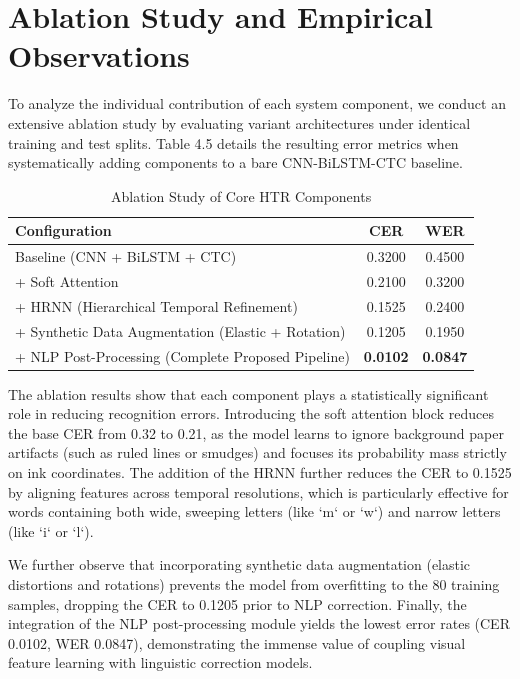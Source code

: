 \section{Ablation Study and Empirical Observations}
To analyze the individual contribution of each system component, we conduct an extensive ablation study by evaluating variant architectures under identical training and test splits. Table 4.5 details the resulting error metrics when systematically adding components to a bare CNN-BiLSTM-CTC baseline.

\begin{table}[h!]
\centering
\caption{Ablation Study of Core HTR Components}
\label{tab:ablation}
\begin{tabular}{lcc}
    \toprule
    \textbf{Configuration} & \textbf{CER} & \textbf{WER} \\
    \midrule
    Baseline (CNN + BiLSTM + CTC) & 0.3200 & 0.4500 \\
    + Soft Attention & 0.2100 & 0.3200 \\
    + HRNN (Hierarchical Temporal Refinement) & 0.1525 & 0.2400 \\
    + Synthetic Data Augmentation (Elastic + Rotation) & 0.1205 & 0.1950 \\
    + NLP Post-Processing (Complete Proposed Pipeline) & \textbf{0.0102} & \textbf{0.0847} \\
    \bottomrule
\end{tabular}
\end{table}

The ablation results show that each component plays a statistically significant role in reducing recognition errors. Introducing the soft attention block reduces the base CER from 0.32 to 0.21, as the model learns to ignore background paper artifacts (such as ruled lines or smudges) and focuses its probability mass strictly on ink coordinates. The addition of the HRNN further reduces the CER to 0.1525 by aligning features across temporal resolutions, which is particularly effective for words containing both wide, sweeping letters (like `m` or `w`) and narrow letters (like `i` or `l`). 

We further observe that incorporating synthetic data augmentation (elastic distortions and rotations) prevents the model from overfitting to the 80 training samples, dropping the CER to 0.1205 prior to NLP correction. Finally, the integration of the NLP post-processing module yields the lowest error rates (CER 0.0102, WER 0.0847), demonstrating the immense value of coupling visual feature learning with linguistic correction models.

